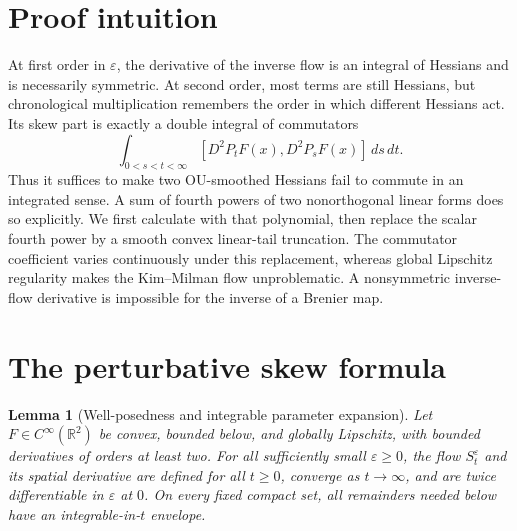 \documentclass[11pt]{article}
\newtheorem{lemma}[theorem]{Lemma}
\newcommand{\R}{\mathbb R}
\newcommand{\Hess}{D^2}
\newcommand{\comm}[2]{[#1,#2]}
\begin{document}
\section{Proof intuition}

At first order in $\varepsilon$, the derivative of the inverse flow is an
integral of Hessians and is necessarily symmetric.  At second order, most
terms are still Hessians, but chronological multiplication remembers the
order in which different Hessians act.  Its skew part is exactly a double
integral of commutators
\[
 \int_{0<s<t<\infty}\comm{\Hess P_tF(x)}{\Hess P_sF(x)}\,ds\,dt.
\]
Thus it suffices to make two OU-smoothed Hessians fail to commute in an
integrated sense.  A sum of fourth powers of two nonorthogonal linear forms
does so explicitly.  We first calculate with that polynomial, then replace
the scalar fourth power by a smooth convex linear-tail truncation.  The
commutator coefficient varies continuously under this replacement, whereas
global Lipschitz regularity makes the Kim--Milman flow unproblematic.  A
nonsymmetric inverse-flow derivative is impossible for the inverse of a
Brenier map.

\section{The perturbative skew formula}

\begin{lemma}[Well-posedness and integrable parameter expansion]\label{lem:bounds}
Let $F\in C^\infty(\R^2)$ be convex, bounded below, and globally Lipschitz,
with bounded derivatives of orders at least two.  For all sufficiently small
$\varepsilon\geq0$, the flow $S_t^\varepsilon$ and its spatial derivative are
defined for all $t\geq0$, converge as $t\to\infty$, and are twice
differentiable in $\varepsilon$ at $0$.  On every fixed compact set, all
remainders needed below have an integrable-in-$t$ envelope.
\end{lemma}
\end{document}
